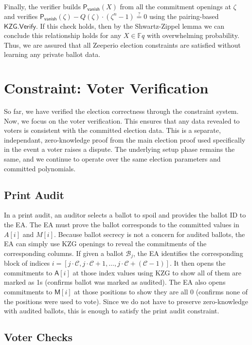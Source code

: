 Finally, the verifier builds $\mathsf{P_{vanish}}(X)$ from all the commitment openings at $\zeta$ and verifies 
$\mathsf{P_{vanish}}(\zeta) - Q(\zeta)\cdot(\zeta^n-1) \stackrel{?}{=} 0$ using the pairing-based $\mathsf{KZG.Verify}$.
If this check holds, then by the Shwartz-Zippel lemma we can conclude this relationship holds for any $X \in \mathbb{F}q$ with overwhelming probability. 
Thus, we are assured that all Zeeperio election constraints are satisfied without learning any private ballot data.

\section{Constraint: Voter Verification}
 
So far, we have verified the election correctness through the constraint system. Now, we focus on the voter verification.
This ensures that any data revealed to voters is consistent with the committed election data. 
This is a separate, independant, zero-knowledge proof from the main election proof used specifically in the event a voter raises a dispute. 
The underlying setup phase remains the same, and we continue to operate over the same election parameters and committed polynomials. 

\subsection{Print Audit}
\label{sec:print}
In a print audit, an auditor selects a ballot to spoil and provides the ballot ID to the EA. The EA must prove the ballot corresponds to the committed values in $A[i]$ and $M[i]$. 
Because ballot secrecy is not a concern for audited ballots, the EA can simply use KZG openings to reveal the commitments of the corresponding columns. 
If given a ballot $\mathcal{B}_j$, the EA identifies the corresponding block of indices $i = [j\cdot \mathcal{C},j\cdot\mathcal{C}+1,\dots,j\cdot\mathcal{C}+(\mathcal{C}-1)]$. 
It then opens the commitments to $\mathsf{A}[i]$ at those index values using KZG to show all of them are marked as 1s (confirms ballot was marked as audited). The EA also opens commitments to $\mathsf{M}[i]$ at those positions to show they are all 0 (confirms none of the positions were used to vote). 
Since we do not have to preserve zero-knowledge with audited ballots, this is enough to satisfy the print audit constraint.

\subsection{Voter Checks}
\label{subsec:receipt-check}

